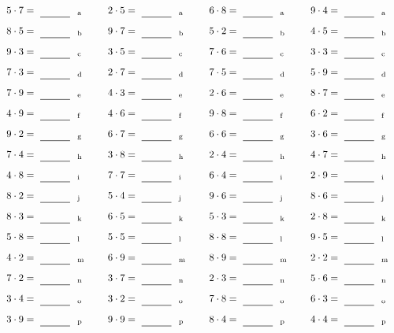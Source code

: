 \documentclass
[
  draft    = true,
  fontsize = 11pt,
  parskip  = half-
]
{scrartcl}
\begin{document}
\par\vfill\par
\begin{align*}
    \pline{5\cdot7}&=\rline{a}
  & \pline{2\cdot5}&=\rline{a}
  & \pline{6\cdot8}&=\rline{a}
  & \pline{9\cdot4}&=\rline{a} \\[1ex]
    \pline{8\cdot5}&=\rline{b}
  & \pline{9\cdot7}&=\rline{b}
  & \pline{5\cdot2}&=\rline{b}
  & \pline{4\cdot5}&=\rline{b} \\[1ex]
    \pline{9\cdot3}&=\rline{c}
  & \pline{3\cdot5}&=\rline{c}
  & \pline{7\cdot6}&=\rline{c}
  & \pline{3\cdot3}&=\rline{c} \\[1ex]
    \pline{7\cdot3}&=\rline{d}
  & \pline{2\cdot7}&=\rline{d}
  & \pline{7\cdot5}&=\rline{d}
  & \pline{5\cdot9}&=\rline{d} \\[1ex]
    \pline{7\cdot9}&=\rline{e}
  & \pline{4\cdot3}&=\rline{e}
  & \pline{2\cdot6}&=\rline{e}
  & \pline{8\cdot7}&=\rline{e} \\[1ex]
    \pline{4\cdot9}&=\rline{f}
  & \pline{4\cdot6}&=\rline{f}
  & \pline{9\cdot8}&=\rline{f}
  & \pline{6\cdot2}&=\rline{f} \\[1ex]
    \pline{9\cdot2}&=\rline{g}
  & \pline{6\cdot7}&=\rline{g}
  & \pline{6\cdot6}&=\rline{g}
  & \pline{3\cdot6}&=\rline{g} \\[1ex]
    \pline{7\cdot4}&=\rline{h}
  & \pline{3\cdot8}&=\rline{h}
  & \pline{2\cdot4}&=\rline{h}
  & \pline{4\cdot7}&=\rline{h} \\[1ex]
    \pline{4\cdot8}&=\rline{i}
  & \pline{7\cdot7}&=\rline{i}
  & \pline{6\cdot4}&=\rline{i}
  & \pline{2\cdot9}&=\rline{i} \\[1ex]
    \pline{8\cdot2}&=\rline{j}
  & \pline{5\cdot4}&=\rline{j}
  & \pline{9\cdot6}&=\rline{j}
  & \pline{8\cdot6}&=\rline{j} \\[1ex]
    \pline{8\cdot3}&=\rline{k}
  & \pline{6\cdot5}&=\rline{k}
  & \pline{5\cdot3}&=\rline{k}
  & \pline{2\cdot8}&=\rline{k} \\[1ex]
    \pline{5\cdot8}&=\rline{l}
  & \pline{5\cdot5}&=\rline{l}
  & \pline{8\cdot8}&=\rline{l}
  & \pline{9\cdot5}&=\rline{l} \\[1ex]
    \pline{4\cdot2}&=\rline{m}
  & \pline{6\cdot9}&=\rline{m}
  & \pline{8\cdot9}&=\rline{m}
  & \pline{2\cdot2}&=\rline{m} \\[1ex]
    \pline{7\cdot2}&=\rline{n}
  & \pline{3\cdot7}&=\rline{n}
  & \pline{2\cdot3}&=\rline{n}
  & \pline{5\cdot6}&=\rline{n} \\[1ex]
    \pline{3\cdot4}&=\rline{o}
  & \pline{3\cdot2}&=\rline{o}
  & \pline{7\cdot8}&=\rline{o}
  & \pline{6\cdot3}&=\rline{o} \\[1ex]
    \pline{3\cdot9}&=\rline{p}
  & \pline{9\cdot9}&=\rline{p}
  & \pline{8\cdot4}&=\rline{p}
  & \pline{4\cdot4}&=\rline{p}
\end{align*}
\end{document}
